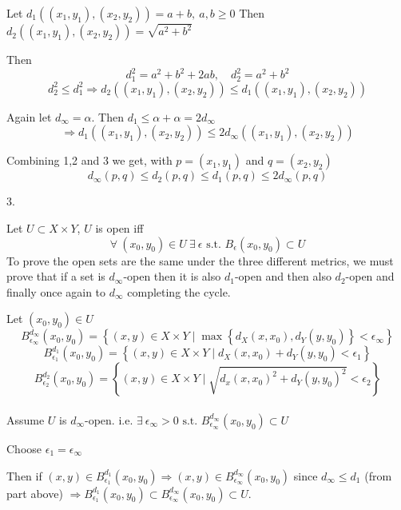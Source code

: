 \documentclass{article}
\begin{document}
\begin{problem}
\begin{solution}
	Let \( d_1((x_{1},y_{1}),(x_{2},y_{2})) = a + b, \ a,b \ge 0 \)
	Then \( d_2((x_{1},y_{1}),(x_{2},y_{2})) = \sqrt{a^2+b^2}  \)

	Then
	\[
		d_1^2 = a^2 + b^2 + 2ab, \quad d_2^2 = a^2 + b^2
	\]
	\begin{equation}
		d_2^2 \le d_{1}^2 \Rightarrow d_2((x_{1},y_{1}),(x_{2},y_{2})) \le d_1((x_{1},y_{1}),(x_{2},y_{2}))
	\end{equation}

	Again let \( d_{\infty} = \alpha \). Then \( d_1 \le \alpha + \alpha = 2d_{\infty} \)
	\begin{equation}
		\Rightarrow d_{1}((x_{1},y_{1}),(x_{2},y_{2})) \le 2 d_{\infty}((x_{1},y_{1}),(x_{2},y_{2}))
	\end{equation}

	Combining 1,2 and 3 we get, with \( p = (x_{1},y_{1}) \) and \( q = (x_{2},y_{2}) \)
	\[
		d_{\infty}(p,q) \le d_2(p,q) \le d_1(p,q) \le 2d_{\infty}(p,q)
	\]
\end{solution}

\begin{solution}3.

	Let \( U \subset X \times Y \), \( U \) is open iff
	\[
		\forall \ (x_{0},y_{0}) \in U \ \exists \ \epsilon \text{ s.t. } B_{\epsilon}(x_{0},y_{0}) \subset U
	\]
	To prove the open sets are the same under the three different metrics, we must prove that if a set is \( d_{\infty} \)-open then it is also \( d_{1} \)-open and then also \( d_{2} \)-open and finally once again to \( d_{\infty} \) completing the cycle.

	Let \( (x_{0},y_{0}) \in U \)
	\[
		B_{\epsilon_{\infty}}^{d_{\infty}}(x_{0},y_{0}) = \left\{ (x,y) \in X \times Y \mid \max\left\{ d_X(x,x_{0}), d_Y(y,y_{0}) \right\} < \epsilon_{\infty} \right\}
	\]
	\[
		B_{\epsilon_{1}}^{d_1}(x_{0},y_{0}) = \left\{ (x,y) \in X\times Y \mid d_X(x,x_{0}) + d_Y(y,y_{0}) < \epsilon_{1}  \right\}
	\]
	\[
		B_{\epsilon_{2}}^{d_{2}}(x_{0},y_{0}) = \left\{ (x,y) \in X\times Y \mid \sqrt{d_x(x,x_{0})^2 + d_Y(y,y_{0})^2} < \epsilon_{2}  \right\}
	\]
	\\

	Assume \( U \) is \( d_{\infty} \)-open. i.e. \( \exists \ \epsilon_{\infty} > 0 \text{ s.t. } B_{\epsilon_{\infty}}^{d_{\infty}}(x_{0},y_{0}) \subset U\)

	Choose \( \epsilon_{1} = \epsilon_{\infty} \)

	Then if \( (x,y) \in B_{\epsilon_{1}}^{d_1}(x_{0},y_{0}) \Rightarrow (x,y) \in B_{\epsilon_{\infty}}^{d_{\infty}}(x_{0},y_{0}) \) since \( d_{\infty} \le d_1 \) (from part above) \( \Rightarrow B_{\epsilon_{1}}^{d_{1}}(x_{0},y_{0}) \subset B_{\epsilon_{\infty}}^{d_{\infty}}(x_{0},y_{0}) \subset U  \).


\end{solution}
\end{problem}
\end{document}
